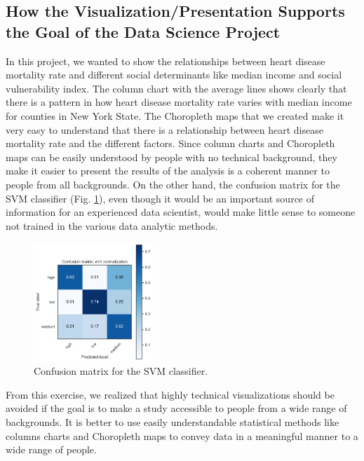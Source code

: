 \documentclass[journal,12pt,onecolumn]{IEEEtran}
\begin{document}
\subsection{How the Visualization/Presentation Supports the Goal of the Data Science Project}
In this project, we wanted to show the relationships between heart disease mortality rate and different social determinants like median income and social vulnerability index.
The column chart with the average lines shows clearly that there is a pattern in how heart disease mortality rate varies with  median income for counties in New York State.
The Choropleth maps that we created make it very easy to understand that there is a relationship between heart disease mortality rate and the different factors.
Since column charts and Choropleth maps can be easily understood by people with no technical background, they make it easier to present the results of the analysis is a coherent manner to people from all backgrounds.
On the other hand, the confusion matrix for the SVM classifier (Fig. \ref{fig:svm}), even though it would be an important source of information for an experienced data scientist, would make little sense to someone not trained in the various data analytic methods.
\begin{figure}[H]
\centering
\includegraphics[width=0.4\textwidth]{figures/ml3.PNG}
\caption{Confusion matrix for the SVM classifier.}
\label{fig:svm}
\end{figure}
From this exercise, we realized that highly technical visualizations should be avoided if the goal is to make a study accessible to people from a wide range of backgrounds.
It is better to use easily understandable statistical methods like columns charts and Choropleth maps to convey data in a meaningful manner to a wide range of people.
\end{document}
